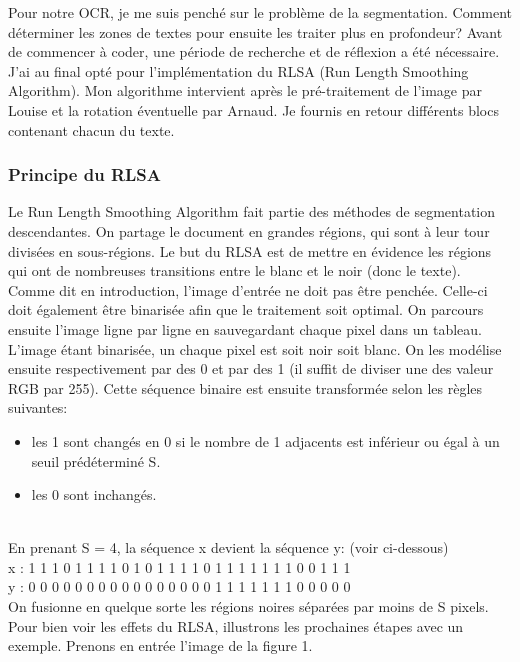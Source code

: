 \documentclass [french,12pt]{article}
\begin{document}
Pour notre OCR, je me suis penché sur le problème de la segmentation.
Comment déterminer les zones de textes pour ensuite les traiter plus en profondeur?
Avant de commencer à coder, une période de recherche et de réflexion a été nécessaire.
J'ai au final opté pour l'implémentation du RLSA (Run Length Smoothing Algorithm). 
Mon algorithme intervient après le pré-traitement de l'image par Louise et la rotation éventuelle par Arnaud.
Je fournis en retour différents blocs contenant chacun du texte. 

\subsubsection{Principe du RLSA}

Le Run Length Smoothing Algorithm fait partie des méthodes de segmentation descendantes. On partage le document en grandes régions, qui sont à leur tour divisées en sous-régions. 
Le but du RLSA est de mettre en évidence les régions qui ont de nombreuses transitions entre le blanc et le noir (donc le texte).
\\
Comme dit en introduction, l'image d'entrée ne doit pas être penchée. Celle-ci doit également être binarisée afin que le traitement soit optimal. 
On parcours ensuite l'image ligne par ligne en sauvegardant chaque pixel dans un tableau. L'image étant binarisée, un chaque pixel est soit noir soit blanc.
On les modélise ensuite respectivement par des 0 et par des 1 (il suffit de diviser une des valeur RGB par 255).
Cette séquence binaire est ensuite transformée selon les règles suivantes:
\begin{itemize}
\item les 1 sont changés en 0 si le nombre de 1 adjacents est inférieur ou égal à un seuil prédéterminé S.
\item les 0 sont inchangés.
\\
\end{itemize}
\\
En prenant S = 4, la séquence x devient la séquence y: (voir ci-dessous) \\
x : 1 1 1 0 1 1 1 1 0 1 0 1 1 1 1 0 1 1 1 1 1 1 1 0 0 1 1 1 \\
y : 0 0 0 0 0 0 0 0 0 0 0 0 0 0 0 0 1 1 1 1 1 1 1 0 0 0 0 0 \\
On fusionne en quelque sorte les régions noires séparées par moins de S pixels.
\\

Pour bien voir les effets du RLSA, illustrons les prochaines étapes avec un exemple. Prenons en entrée l'image de la figure 1.
\end{document}
